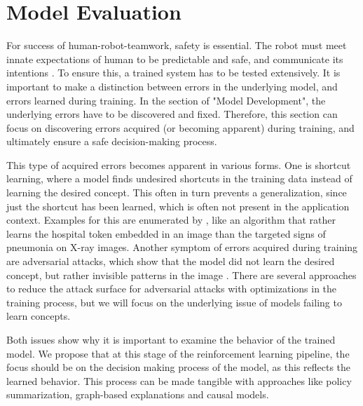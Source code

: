 \documentclass[twoside,11pt]{article}
\begin{document}
\section{Model Evaluation}
\label{sec:Evaluation}

For success of human-robot-teamwork, safety is essential. The robot must meet innate expectations of human to be predictable and safe, and communicate its intentions \citep{EderHarperLeonards:2014:HITLRoboticsSafetyAssurance}. To ensure this, a trained system has to be tested extensively. It is important to make a distinction between errors in the underlying model, and errors learned during training. In the section of "Model Development", the underlying errors have to be discovered and fixed. Therefore, this section can focus on discovering errors acquired (or becoming apparent) during training, and ultimately ensure a safe decision-making process.

This type of acquired errors becomes apparent in various forms. One is shortcut learning, where a model finds undesired shortcuts in the training data instead of learning the desired concept. This often in turn prevents a generalization, since just the shortcut has been learned, which is often not present in the application context. Examples for this are enumerated by \citet{GeirhosEtAl:2020:ShortcutLearningDNN}, like an algorithm that rather learns the hospital token embedded in an image than the targeted signs of pneumonia on X-ray images.
Another symptom of errors acquired during training are adversarial attacks, which show that the model did not learn the desired concept, but rather invisible patterns in the image \citep{GoodfellowShlensSzegedy:2014:AdversarialExamples}. There are several approaches to reduce the attack surface for adversarial attacks with optimizations in the training process, but we will focus on the underlying issue of models failing to learn concepts.

Both issues show why it is important to examine the behavior of the trained model. We propose that at this stage of the reinforcement learning pipeline, the focus should be on the decision making process of the model, as this reflects the learned behavior. This process can be made tangible with approaches like policy summarization, graph-based explanations and causal models.

\end{document}
